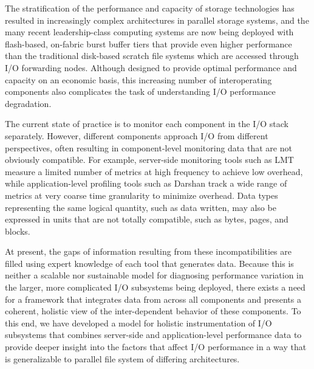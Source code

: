 \documentclass[conference,10pt,compsocconf]{IEEEtran}
\begin{document}
The stratification of the performance and capacity of storage technologies has
resulted in increasingly complex architectures in parallel storage systems, and
the many recent leadership-class computing systems are now being deployed with
flash-based, on-fabric burst buffer tiers\cite{Henseler2016} that provide even higher performance
than the traditional disk-based scratch file systems which are accessed through
I/O forwarding nodes\cite{Bhimji2016}.  Although designed to provide optimal performance and
capacity on an economic basis, this increasing number of interoperating
components also complicates the task of understanding I/O performance
degradation.


The current state of practice is to monitor each component in the I/O stack
separately.  However, different components approach I/O from different
perspectives, often resulting in component-level monitoring data that are not
obviously compatible.  For example, server-side monitoring tools such as
LMT\cite{lmt} measure a limited number of metrics at high frequency to achieve
low overhead, while application-level profiling tools such as
Darshan\cite{carns200924} track a wide range of metrics at very coarse time
granularity to minimize overhead.  Data types representing the same logical
quantity, such as data written, may also be expressed in units that are not
totally compatible, such as bytes, pages, and blocks.


At present, the gaps of information resulting from these incompatibilities are
filled using expert knowledge of each tool that generates data.  Because this is
neither a scalable nor sustainable model for diagnosing performance variation in
the larger, more complicated I/O subsystems being deployed, there exists a need
for a framework that integrates data from across all components and presents a
coherent, holistic view of the inter-dependent behavior of these components.  To
this end, we have developed a model for holistic instrumentation of I/O
subsystems that combines server-side and application-level performance data to
provide deeper insight into the factors that affect I/O performance in a way
that is generalizable to parallel file system of differing architectures.
\end{document}
